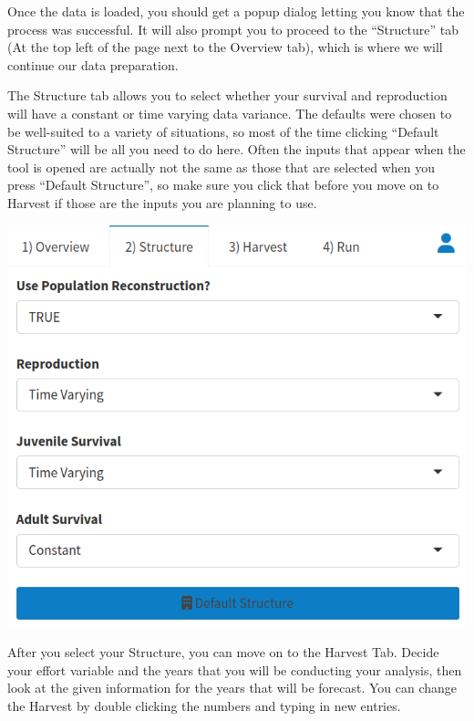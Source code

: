 \documentclass[
]{book}
\begin{document}
Once the data is loaded, you should get a popup dialog letting you know that the process was successful. It will also prompt you to proceed to the ``Structure'' tab (At the top left of the page next to the Overview tab), which is where we will continue our data preparation.

The Structure tab allows you to select whether your survival and reproduction will have a constant or time varying data variance. The defaults were chosen to be well-suited to a variety of situations, so most of the time clicking {``Default Structure''} will be all you need to do here. Often the inputs that appear when the tool is opened are actually not the same as those that are selected when you press {``Default Structure''}, so make sure you click that before you move on to Harvest if those are the inputs you are planning to use.

\includegraphics{./www/ipm_walk4.png}

After you select your Structure, you can move on to the Harvest Tab. Decide your effort variable and the years that you will be conducting your analysis, then look at the given information for the years that will be forecast. You can change the Harvest by double clicking the numbers and typing in new entries.
\end{document}
